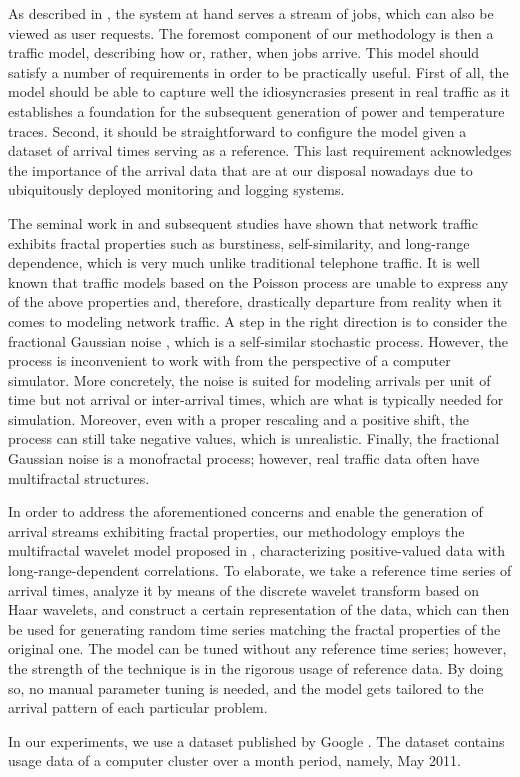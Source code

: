 As described in , the system at hand serves a stream
of jobs, which can also be viewed as user requests. The foremost component of
our methodology is then a traffic model, describing how or, rather, when jobs
arrive. This model should satisfy a number of requirements in order to be
practically useful. First of all, the model should be able to capture well the
idiosyncrasies present in real traffic as it establishes a foundation for the
subsequent generation of power and temperature traces. Second, it should be
straightforward to configure the model given a dataset of arrival times serving
as a reference. This last requirement acknowledges the importance of the arrival
data that are at our disposal nowadays due to ubiquitously deployed monitoring
and logging systems.

The seminal work in \cite{leland1994} and subsequent studies have shown that
network traffic exhibits fractal properties such as burstiness, self-similarity,
and long-range dependence, which is very much unlike traditional telephone
traffic. It is well known that traffic models based on the Poisson process
\cite{lifshits2014} are unable to express any of the above properties and,
therefore, drastically departure from reality when it comes to modeling network
traffic. A step in the right direction is to consider the fractional Gaussian
noise \cite{lifshits2014}, which is a self-similar stochastic process. However,
the process is inconvenient to work with from the perspective of a computer
simulator. More concretely, the noise is suited for modeling arrivals per unit
of time but not arrival or inter-arrival times, which are what is typically
needed for simulation. Moreover, even with a proper rescaling and a positive
shift, the process can still take negative values, which is unrealistic.
Finally, the fractional Gaussian noise is a monofractal process; however, real
traffic data often have multifractal structures.

In order to address the aforementioned concerns and enable the generation of
arrival streams exhibiting fractal properties, our methodology employs the
multifractal wavelet model proposed in \cite{riedi1999}, characterizing
positive-valued data with long-range-dependent correlations. To elaborate, we
take a reference time series of arrival times, analyze it by means of the
discrete wavelet transform based on Haar wavelets, and construct a certain
representation of the data, which can then be used for generating random time
series matching the fractal properties of the original one. The model can be
tuned without any reference time series; however, the strength of the technique
is in the rigorous usage of reference data. By doing so, no manual parameter
tuning is needed, and the model gets tailored to the arrival pattern of each
particular problem.

In our experiments, we use a dataset published by Google \cite{google}. The
dataset contains usage data of a computer cluster over a month period, namely,
May 2011.
